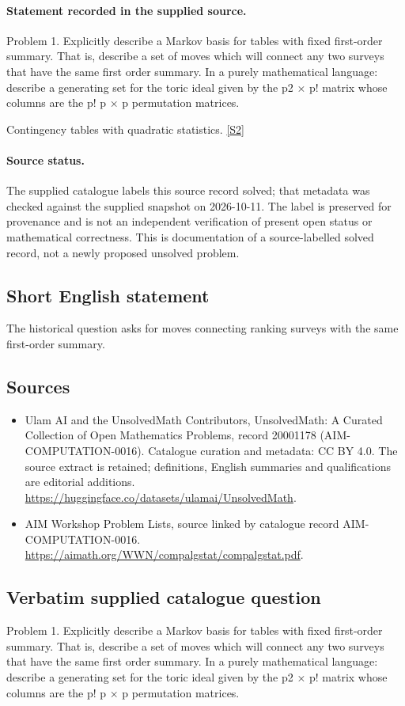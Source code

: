 \documentclass[11pt]{article}
\begin{document}
\paragraph{Statement recorded in the supplied source.}
Problem 1. Explicitly describe a Markov basis for tables with fixed first-order summary. That is, describe a set of moves which will connect any two surveys that have the same first order summary. In a purely mathematical language: describe a generating set for the toric ideal given by the p2 × p! matrix whose columns are the p! p × p permutation matrices.

Contingency tables with quadratic statistics. \href{https://aimath.org/WWN/compalgstat/compalgstat.pdf}{[S2]}
\paragraph{Source status.}
The supplied catalogue labels this source record solved; that metadata was checked against the supplied snapshot on 2026-10-11. The label is preserved for provenance and is not an independent verification of present open status or mathematical correctness. This is documentation of a source-labelled solved record, not a newly proposed unsolved problem.
\subsection{Short English statement}
The historical question asks for moves connecting ranking surveys with the same first-order summary.
\subsection{Sources}
\begin{itemize}
\item[S1] Ulam AI and the UnsolvedMath Contributors, UnsolvedMath: A Curated Collection of Open Mathematics Problems, record 20001178 (AIM-COMPUTATION-0016). Catalogue curation and metadata: CC BY 4.0. The source extract is retained; definitions, English summaries and qualifications are editorial additions.
\url{https://huggingface.co/datasets/ulamai/UnsolvedMath}.
\item[S2] AIM Workshop Problem Lists, source linked by catalogue record AIM-COMPUTATION-0016.
\url{https://aimath.org/WWN/compalgstat/compalgstat.pdf}.
\end{itemize}
\subsection{Verbatim supplied catalogue question}
Problem 1. Explicitly describe a Markov basis for tables with fixed first-order summary. That is, describe a set of moves which will connect any two surveys that have the same first order summary. In a purely mathematical language: describe a generating set for the toric ideal given by the p2 × p! matrix whose columns are the p! p × p permutation matrices.
\end{document}
